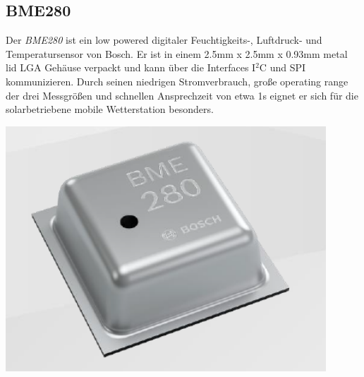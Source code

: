 \subsection{BME280}
\label{BME280}
{\begin{minipage}[b][6cm][t]{0.55\textwidth}
Der \textit{BME280} ist ein low powered digitaler Feuchtigkeits-, Luftdruck- und Temperatursensor von Bosch. Er ist in einem 2.5mm x 2.5mm x 0.93mm metal lid LGA Gehäuse verpackt und kann über die Interfaces I$^{2}$C und SPI kommunizieren. Durch seinen niedrigen Stromverbrauch, große operating range der drei Messgrößen und schnellen Ansprechzeit von etwa 1s eignet er sich für die solarbetriebene mobile Wetterstation besonders. \cite{Bosch2019}\\
\end{minipage}}
{\begin{minipage}[b][6cm][t]{0.44\textwidth}
\centering
\includegraphics[width=0.9\textwidth]{graphics/bme280/bme280.PNG}
\label{fig:bme280}
\end{minipage}}


